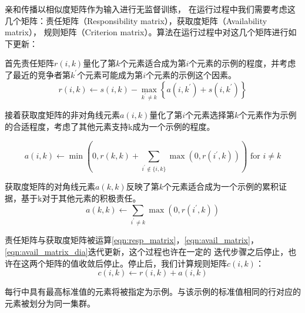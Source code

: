 \documentclass[bachelor, nocolorlinks, printoneside]{seuthesis} %
\begin{document}
\begin{Main}
亲和传播以相似度矩阵作为输入进行无监督训练，
在运行过程中我们需要考虑这几个矩阵：责任矩阵（Responsibility matrix），获取度矩阵（Availability matrix），
规则矩阵（Criterion matrix）。算法在运行过程中对这几个矩阵进行如下更新：

首先责任矩阵$r(i,k)$量化了第$k$个元素适合成为第$i$个元素的示例的程度，并考虑了最近的竞争者第$k^{'}$个元素可能成为第$i$个元素的示例这个因素。
\begin{equation}\label{eqn:resp_matrix}
    r(i, k) \leftarrow s(i, k)-\max _{k^{\prime} \neq k}\left\{a\left(i, 
k^{\prime}\right)+s\left(i, k^{\prime}\right)\right\}
\end{equation}

接着获取度矩阵的非对角线元素$a(i,k)$量化了第$i$个元素选择第$k$个元素作为示例的合适程度，考虑了其他元素支持k成为一个示例的程度。

\begin{equation}\label{eqn:avail_matrix}
    a(i, k) \leftarrow \min \left(0, r(k, k)+\sum_{i^{\prime} \notin\{i, k\}} \max \left(0, r\left(i^{\prime}, k\right)\right)\right) \text { for } i \neq k
\end{equation}

获取度矩阵的对角线元素$a(k,k)$反映了第$k$个元素适合成为一个示例的累积证据，基于k对于其他元素的积极责任。
\begin{equation}\label{eqn:avail_matrix_dia}
    a(k, k) \leftarrow \sum_{i^{\prime} \neq k} \max \left(0, r\left(i^{\prime}, k\right)\right)
\end{equation}

责任矩阵与获取度矩阵被运算\ref{eqn:resp_matrix}，\ref{eqn:avail_matrix}，\ref{eqn:avail_matrix_dia}迭代更新，这个过程也许在一定的
迭代步骤之后停止，也许在这两个矩阵的值收敛后停止。停止后，我们计算规则矩阵$c(i,k)$：
\begin{equation}
    c(i, k) \leftarrow r(i, k)+a(i, k)
\end{equation}

每行中具有最高标准值的元素将被指定为示例。与该示例的标准值相同的行对应的元素被划分为同一集群。


\end{Main}
\end{document}
